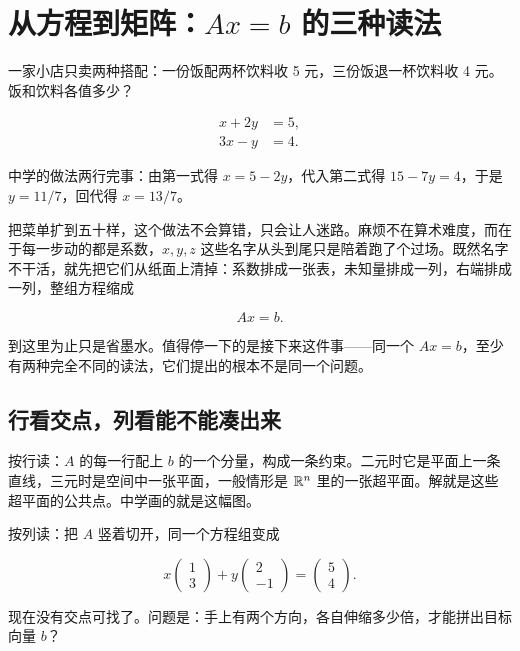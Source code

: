 \section{\texorpdfstring{从方程到矩阵：\(Ax=b\) 的三种读法}{从方程到矩阵：Ax=b 的三种读法}}
\label{sec:03-Linear-Algebra/01-Linear-Systems-and-Matrices/01}

一家小店只卖两种搭配：一份饭配两杯饮料收 5 元，三份饭退一杯饮料收 4 元。饭和饮料各值多少？

\[
\begin{aligned}
x+2y&=5,\\
3x-y&=4.
\end{aligned}
\]

中学的做法两行完事：由第一式得 \(x=5-2y\)，代入第二式得 \(15-7y=4\)，于是 \(y=11/7\)，回代得 \(x=13/7\)。

把菜单扩到五十样，这个做法不会算错，只会让人迷路。麻烦不在算术难度，而在于每一步动的都是系数，\(x,y,z\) 这些名字从头到尾只是陪着跑了个过场。既然名字不干活，就先把它们从纸面上清掉：系数排成一张表，未知量排成一列，右端排成一列，整组方程缩成

\[
Ax=b.
\]

到这里为止只是省墨水。值得停一下的是接下来这件事——同一个 \(Ax=b\)，至少有两种完全不同的读法，它们提出的根本不是同一个问题。

\subsection{行看交点，列看能不能凑出来}

按行读：\(A\) 的每一行配上 \(b\) 的一个分量，构成一条约束。二元时它是平面上一条直线，三元时是空间中一张平面，一般情形是 \(\mathbb{R}^n\) 里的一张超平面。解就是这些超平面的公共点。中学画的就是这幅图。

按列读：把 \(A\) 竖着切开，同一个方程组变成

\[
x\begin{pmatrix}1\\3\end{pmatrix}+y\begin{pmatrix}2\\-1\end{pmatrix}=\begin{pmatrix}5\\4\end{pmatrix}.
\]

现在没有交点可找了。问题是：手上有两个方向，各自伸缩多少倍，才能拼出目标向量 \(b\)？

